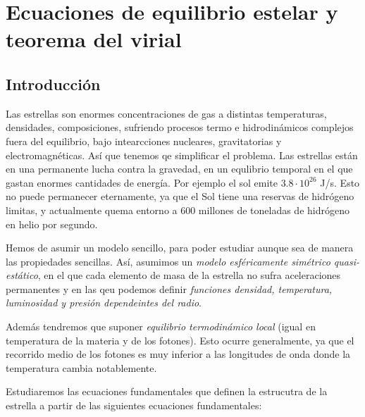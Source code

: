 

\section{Ecuaciones de equilibrio estelar y teorema del virial}

\subsection{Introducción}

Las estrellas son enormes concentraciones de gas a distintas temperaturas, densidades, composiciones, sufriendo procesos termo e hidrodinámicos complejos fuera del equilibrio, bajo intearcciones nucleares, gravitatorias y electromagnéticas. Así que tenemos qe simplificar el problema. Las estrellas están en una permanente lucha contra la gravedad, en un equlibrio temporal en el que gastan enormes cantidades de energía. Por ejemplo el sol emite $3.8 \cdot 10^{26}$ J/s. Esto no puede permanecer eternamente, ya que el Sol tiene una reservas de hidrógeno limitas, y actualmente quema entorno a 600 millones de toneladas de hidrógeno en helio por segundo.

Hemos de asumir un modelo sencillo, para poder estudiar aunque sea de manera las propiedades sencillas. Así, asumimos un \textit{modelo esféricamente simétrico quasi-estático}, en el que cada elemento de masa de la estrella no sufra aceleraciones permanentes y en las qeu podemos definir \textit{funciones densidad, temperatura, luminosidad y presión dependeintes del radio}.

Además tendremos que suponer \textit{equilibrio termodinámico local} (igual en temperatura de la materia y de los fotones). Esto ocurre generalmente, ya que el recorrido medio de los fotones es muy inferior a las longitudes de onda donde la temperatura cambia notablemente. 

Estudiaremos las ecuaciones fundamentales que definen la estrucutra de la estrella a partir de las siguientes ecuaciones fundamentales: 

